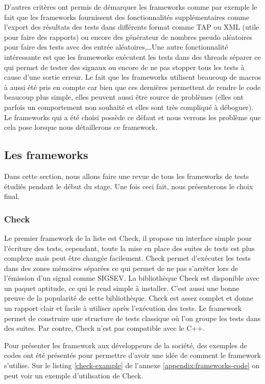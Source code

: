 \documentclass[a4paper]{article}
\begin{document}
D'autres critères ont permis de démarquer les frameworks comme par exemple le
fait que les frameworks fournissent des fonctionnalités supplémentaires comme
l'export des résultats des tests dans différents format comme TAP ou XML (utile
pour faire des rapports) ou encore des générateur de nombres pseudo aléatoires
pour faire des tests avec des entrée aléatoires,\dots Une autre fonctionnalité
intéressante est que les frameworks exécutent les tests dans des threads séparer
ce qui permet de tester des signaux ou encore de ne pas stopper tous les tests à
cause d'une sortie erreur. Le fait que les frameworks utilisent beaucoup de
macros à aussi été pris en compte car bien que ces dernières permettent de
rendre le code beaucoup plus simple, elles peuvent aussi être source de
problèmes (elles ont parfois un comportement non souhaité et elles sont très
compliqué à déboguer). Le frameworks qui a été choisi possède ce défaut et nous
verrons les problème que cela pose lorsque nous détaillerons ce framework.
\subsection{Les frameworks}%

Dans cette section, nous allons faire une revue de tous les frameworks de tests
étudiés pendant le début du stage. Une fois ceci fait, nous présenterons le
choix final.

\subsubsection*{Check}

Le premier framework de la liste est Check, il propose un interface simple pour
l'écriture des tests, cependant, toute la mise en place des suites de tests est
plus complexe mais peut être changée facilement. Check permet d'exécuter les
tests dans des zones mémoires séparées ce qui permet de ne pas s'arrêter lors de
l'émission d'un signal comme SIGSEV. La bibliothèque Check est disponible avec
un paquet aptitude, ce qui le rend simple à installer. C'est aussi une bonne
preuve de la popularité de cette bibliothèque. Check est assez complet et donne
un rapport clair et facile à utiliser après l'exécution des tests. Le framework
permet de construire une structure de tests classique où l'on groupe les tests
dans des suites. Par contre, Check n'est pas compatible avec le C++.

Pour présenter les framework aux développeurs de la société, des exemples de
codes ont été présentés pour permettre d'avoir une idée de comment le framework
s'utilise. Sur le listing \ref{check-example} de l'annexe
\ref{appendix:frameworks-code} on peut voir un exemple d'utilisation de Check.
\end{document}
